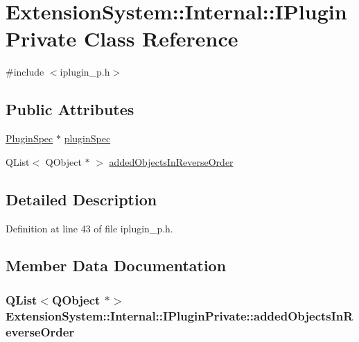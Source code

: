 \hypertarget{class_extension_system_1_1_internal_1_1_i_plugin_private}{\section{\-Extension\-System\-:\-:\-Internal\-:\-:\-I\-Plugin\-Private \-Class \-Reference}
\label{class_extension_system_1_1_internal_1_1_i_plugin_private}
}


{\ttfamily \#include $<$iplugin\-\_\-p.\-h$>$}

\subsection*{\-Public \-Attributes}
\begin{DoxyCompactItemize}
\item 
\hyperlink{class_extension_system_1_1_plugin_spec}{\-Plugin\-Spec} $\ast$ \hyperlink{class_extension_system_1_1_internal_1_1_i_plugin_private_a377dc83eb6f39dfa7a57a0530c064d57}{plugin\-Spec}
\item 
\-Q\-List$<$ \-Q\-Object $\ast$ $>$ \hyperlink{class_extension_system_1_1_internal_1_1_i_plugin_private_a33f73d57a0b9908d1dfe74e5084c5747}{added\-Objects\-In\-Reverse\-Order}
\end{DoxyCompactItemize}


\subsection{\-Detailed \-Description}


\-Definition at line 43 of file iplugin\-\_\-p.\-h.



\subsection{\-Member \-Data \-Documentation}
\hypertarget{class_extension_system_1_1_internal_1_1_i_plugin_private_a33f73d57a0b9908d1dfe74e5084c5747}{
\subsubsection[{added\-Objects\-In\-Reverse\-Order}]{\setlength{\rightskip}{0pt plus 5cm}\-Q\-List$<$\-Q\-Object $\ast$$>$ {\bf \-Extension\-System\-::\-Internal\-::\-I\-Plugin\-Private\-::added\-Objects\-In\-Reverse\-Order}}}\label{class_extension_system_1_1_internal_1_1_i_plugin_private_a33f73d57a0b9908d1dfe74e5084c5747}


